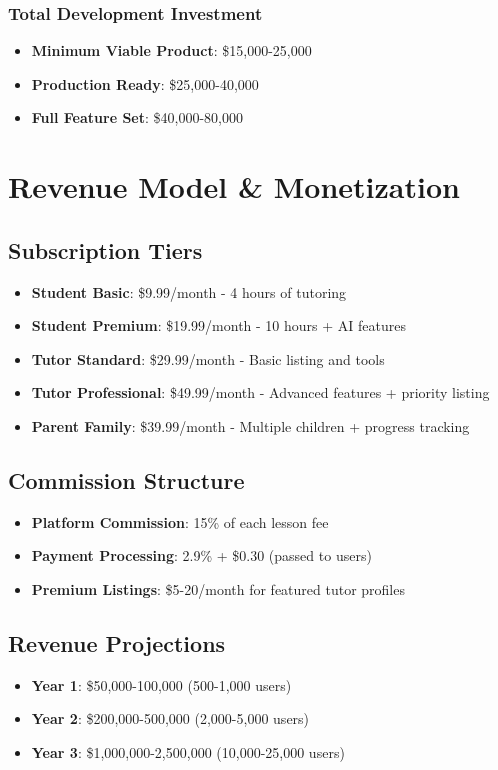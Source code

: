 \documentclass[11pt,a4paper]{article}
\begin{document}
\subsubsection{Total Development Investment}
\begin{itemize}
    \item \textbf{Minimum Viable Product}: \$15,000-25,000
    \item \textbf{Production Ready}: \$25,000-40,000
    \item \textbf{Full Feature Set}: \$40,000-80,000
\end{itemize}

\section{Revenue Model \& Monetization}

\subsection{Subscription Tiers}
\begin{itemize}
    \item \textbf{Student Basic}: \$9.99/month - 4 hours of tutoring
    \item \textbf{Student Premium}: \$19.99/month - 10 hours + AI features
    \item \textbf{Tutor Standard}: \$29.99/month - Basic listing and tools
    \item \textbf{Tutor Professional}: \$49.99/month - Advanced features + priority listing
    \item \textbf{Parent Family}: \$39.99/month - Multiple children + progress tracking
\end{itemize}

\subsection{Commission Structure}
\begin{itemize}
    \item \textbf{Platform Commission}: 15\% of each lesson fee
    \item \textbf{Payment Processing}: 2.9\% + \$0.30 (passed to users)
    \item \textbf{Premium Listings}: \$5-20/month for featured tutor profiles
\end{itemize}

\subsection{Revenue Projections}
\begin{itemize}
    \item \textbf{Year 1}: \$50,000-100,000 (500-1,000 users)
    \item \textbf{Year 2}: \$200,000-500,000 (2,000-5,000 users)
    \item \textbf{Year 3}: \$1,000,000-2,500,000 (10,000-25,000 users)
\end{itemize}
\end{document}
